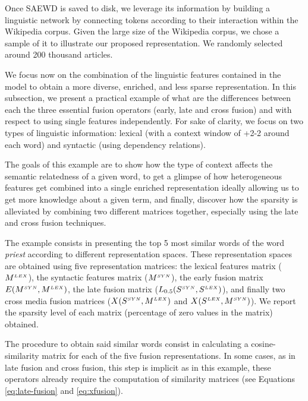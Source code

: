 Once SAEWD is saved to disk, we leverage its information by building a linguistic network by connecting tokens according to their interaction within the Wikipedia corpus. Given the large size of the Wikipedia corpus, we chose a sample of it to illustrate our proposed representation. We randomly selected around 200 thousand articles. %


%

We focus now on the combination of the linguistic features contained in the model to obtain a more diverse, enriched, and less sparse representation. In this subsection, we present a practical example of what are the differences between each the three essential fusion operators (early, late and cross fusion)  and with respect to using single features independently. For sake of clarity, we focus on two types of linguistic information: lexical (with a context window  of +2-2 around each word) and syntactic (using  dependency relations).

The goals of this example are to show how the type of context affects the semantic relatedness of a given word, to get a glimpse of how heterogeneous features get combined into a single enriched representation ideally allowing us to get more knowledge about a given term, and finally, discover how the sparsity is alleviated by combining two different matrices together, especially using the late and cross fusion techniques. 

The example consists in presenting the top 5 most similar words of the word \textit{priest} according to different representation spaces. These representation spaces are obtained using five representation matrices: the lexical features matrix ($M^{\scriptscriptstyle LEX}$),  the syntactic features matrix ($M^{\scriptscriptstyle SYN}$), the early fusion matrix $E(M^{\scriptscriptstyle SYN},M^{\scriptscriptstyle LEX})$, the late fusion matrix ($L_{0.5}(S^{\scriptscriptstyle SYN},S^{\scriptscriptstyle LEX})$), and finally two cross media fusion matrices ($X(S^{\scriptscriptstyle SYN},M^{\scriptscriptstyle LEX})$ and $X(S^{\scriptscriptstyle LEX},M^{\scriptscriptstyle SYN})$). We  report the sparsity level of each matrix (percentage of zero values in the matrix) obtained. 

The procedure to obtain said similar words consist in calculating a cosine-similarity matrix for each of the five fusion representations. In some cases, as in late fusion and cross fusion, this step is implicit as in this example, these operators already require the computation of similarity matrices (see Equations \ref{eq:late-fusion} and \ref{eq:xfusion}).

